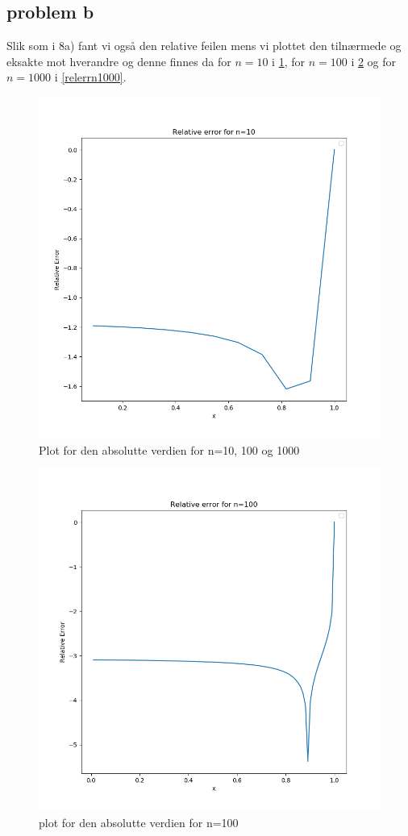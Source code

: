 \documentclass[english,notitlepage]{revtex4-1}  %
\begin{document}
\subsection*{problem b}
Slik som i 8a) fant vi også den relative feilen mens vi plottet den tilnærmede og eksakte mot hverandre og denne finnes da for $n=10$ i \ref{relerrn10}, for $n=100$ i \ref{relerrn100} og for $n=1000$ i \ref{relerrn1000}.
\begin{figure}
	\centering
	\includegraphics[scale=0.5]{Images/relerr10.png}
	\caption{Plot for den absolutte verdien for n=10, 100 og 1000}
	\label{relerrn10}
\end{figure}
\begin{figure}
	\centering
	\includegraphics[scale=0.5]{Images/relerr100.png}
	\caption{plot for den absolutte verdien for n=100}
	\label{relerrn100}
\end{figure}
\end{document}
